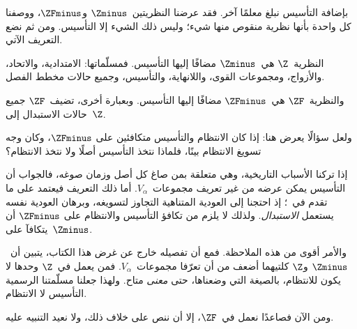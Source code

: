 \documentclass[../../../include/open-logic-section]{subfiles}
\begin{document}

بإضافة التأسيس نبلغ معلمًا آخر. فقد عرضنا النظريتين~$\Zminus$
و$\ZFminus$، ووصفنا كل واحدة بأنها نظرية منقوص منها شيء؛ وليس ذلك
الشيء إلا التأسيس. ومن ثم نضع التعريف الآتي.

\begin{defn}
النظرية~$\Z$ هي~$\Zminus$ مضافًا إليها التأسيس. فمسلّماتها:
الامتدادية، والاتحاد، والأزواج، ومجموعات القوى، واللانهاية، والتأسيس،
وجميع حالات مخطط الفصل.

والنظرية~$\ZF$ هي~$\ZFminus$ مضافًا إليها التأسيس. وبعبارة أخرى،
تضيف~$\ZF$ جميع حالات الاستبدال إلى~$\Z$.
\end{defn}

ولعل سؤالًا يعرض هنا: إذا كان الانتظام والتأسيس متكافئين على
$\ZFminus$، وكان وجه تسويغ الانتظام بينًا، فلماذا نتخذ التأسيس أصلًا
ولا نتخذ الانتظام؟

إذا تركنا الأسباب التاريخية، وهي متعلقة بمن صاغ كل أصل وزمان صوغه،
فالجواب أن التأسيس يمكن عرضه من غير تعريف مجموعات~$V_\alpha$. أما ذلك
التعريف فيعتمد على ما تقدم في~؛ إذ احتجنا إلى
العودية المتناهية التجاوز لتسويغه، وبرهان العودية نفسه يستعمل
\emph{الاستبدال}. ولذلك لا يلزم من تكافؤ التأسيس والانتظام على
$\ZFminus$ أن يتكافآ على~$\Zminus$.

والأمر أقوى من هذه الملاحظة. فمع أن تفصيله خارج عن غرض هذا الكتاب،
يتبين أن~$\Zminus$ و$\Z$ كلتيهما أضعف من أن تعرّفا مجموعات~$V_\alpha$.
فمن يعمل في~$\Z$ وحدها لا يكون للانتظام، بالصيغة التي وضعناها، حتى
\emph{معنى} متاح. ولهذا جعلنا مسلّمتنا الرسمية التأسيس لا الانتظام.

ومن الآن فصاعدًا نعمل في~$\ZF$، إلا أن ننص على خلاف ذلك، ولا نعيد
التنبيه عليه.
\end{document}
